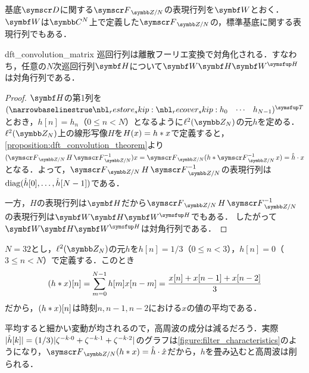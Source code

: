 \documentclass[../../main]{subfiles}
\begin{document}
基底\(\basis{D}\)に関する\(\dft{N}\)の表現行列を\(\mat{W}\)とおく．\(\mat{W}\)は\(\numset{C}^N\)上で定義した\(\dft{N}\)の，標準基底に関する表現行列でもある．

\begin{corollary}{}{dft_convolution_matrix}
  巡回行列は離散フーリエ変換で対角化される．すなわち，任意の\(N\)次巡回行列\(\mat{H}\)について\(\mat{W}\mat{H}\htrps{\mat{W}}\)は対角行列である．
\end{corollary}

\begin{proof}
  \(\mat{H}\)の第1列を\(\trps{\rowvect{h_0 & \cdots & h_{N-1}}}\)とおき，\(h[n]=h_n\)（\(0\leq n<N\)）となるように\(\cycles{N}\)の元\(h\)を定める．
  \(\cycles{N}\)上の線形写像\(H\)を\(H(x)=h\ast x\)で定義すると，\cref{proposition:dft_convolution_theorem}より\((\dft{N}H\dft*{N})x=\dft{N}(h\circconv\dft*{N}x)=\hat{h}\cdot x\)となる．よって，\(\dft{N}H\dft*{N}\)の表現行列は\(\operatorname{diag}(\hat{h}[0],\dots,\hat{h}[N-1])\)である．

  一方，\(H\)の表現行列は\(\mat{H}\)だから\(\dft{N}H\dft*{N}\)の表現行列は\(\mat{W}\mat{H}\htrps{\mat{W}}\)でもある．
  したがって\(\mat{W}\mat{H}\htrps{\mat{W}}\)は対角行列である．
\end{proof}

\begin{example}
  \label{example:cyclic_filter}
  \(N=32\)とし，\(\cycles{N}\)の元\(h\)を\(h[n]=1/3\)（\(0\leq n<3\)），\(h[n]=0\)（\(3\leq n<N\)）で定義する．このとき
  \[
    (h\ast x)[n] = \sum_{m=0}^{N-1}h[m]x[n-m]
    = \frac{x[n]+x[n-1]+x[n-2]}{3}
  \]
  だから，\((h\ast x)[n]\)は時刻\(n,n-1,n-2\)における\(x\)の値の平均である．

  平均すると細かい変動が均されるので，高周波の成分は減るだろう．実際\(\lvert\hat{h}[k]\rvert=(1/3)\lvert\zeta^{-k\cdot 0}+\zeta^{-k\cdot 1}+\zeta^{-k\cdot 2}\rvert\)のグラフは\cref{figure:filter_characteristics}のようになり，\(\dft{N}(h\circconv x)=\hat{h}\cdot\hat{x}\)だから，\(h\)を畳み込むと高周波は削られる．
\end{example}
\end{document}
